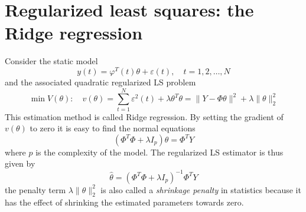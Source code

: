 \documentclass{book}
\theoremstyle{definition}
\theoremstyle{remark}
\theoremstyle{remark}
\begin{document}
\section{Regularized least squares: the Ridge regression}
Consider the static model 
\[
  y(t)=\varphi^T(t)\theta+\varepsilon(t),\quad t=1,2,\dots,N
\]
and the associated quadratic regularized LS problem 
\[
  \min V(\theta): \quad v(\theta)=\displaystyle\sum_{t=1}^{N}\varepsilon^2(t)+\lambda\theta^T\theta=\|Y-\Phi\theta\|^2+\lambda\|\theta\|_2^2
\]
This estimation method is called Ridge regression. By setting the gradient of $v(\theta)$ to zero it is easy to find the normal equations 
\[
    (\Phi^T\Phi+\lambda I_p)\theta=\Phi^TY
\]
where $p$ is the complexity of the model. The regularized LS estimator is thus given by 
\[
    \hat{\theta}=(\Phi^T\Phi+\lambda I_p)^{-1}\Phi^TY
\]
the penalty term $\lambda\|\theta\|_2^2$ is also called a \emph{shrinkage penalty} in statistics because it has the effect of shrinking the estimated parameters towards zero. 
\end{document}

